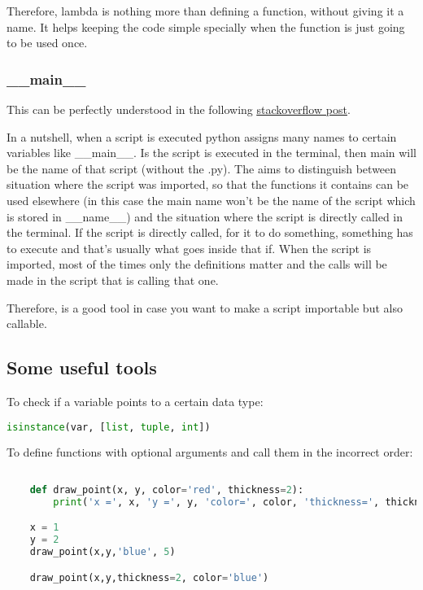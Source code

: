 Therefore, lambda is nothing more than defining a function, without giving it a name. It helps keeping the code simple specially when the function is just going to be used once.




\subsubsection{\_\_main\_\_}
This can be perfectly understood in the following \href{https://stackoverflow.com/questions/419163/what-does-if-name-main-do}{\ul{stackoverflow post}}.

In a nutshell, when a script is executed python assigns many names to certain variables like \_\_main\_\_. Is the script is executed in the terminal, then main will be the name of that script (without the .py). The  aims to distinguish between situation where the script was imported, so that the functions it contains can be used elsewhere (in this case the main name won't be the name of the script which is stored in \_\_name\_\_) and the situation where the script is directly called in the terminal. If the script is directly called, for it to do something, something has to execute and that's usually what goes inside that if. When the script is imported, most of the times only the definitions matter and the calls will be made in the script that is calling that one. 

Therefore, is a good tool in case you want to make a script importable but also callable.

\subsection{Some useful tools}
To check if a variable points to a certain data type:
\begin{lstlisting}[language=python]
    isinstance(var, [list, tuple, int])
\end{lstlisting}

\vspace{1cm}
To define functions with optional arguments and call them in the incorrect order:

\begin{lstlisting}[language=python]
    
    def draw_point(x, y, color='red', thickness=2): 
        print('x =', x, 'y =', y, 'color=', color, 'thickness=', thickness)

    x = 1
    y = 2
    draw_point(x,y,'blue', 5)

    draw_point(x,y,thickness=2, color='blue')

\end{lstlisting}



